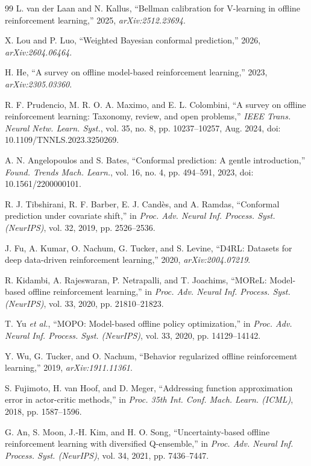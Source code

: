 \documentclass[journal]{IEEEtran}
\begin{document}
\begin{thebibliography}{99}
L. van der Laan and N. Kallus, ``Bellman calibration for V-learning in offline reinforcement learning,'' 2025, \emph{arXiv:2512.23694}.

X. Lou and P. Luo, ``Weighted Bayesian conformal prediction,'' 2026, \emph{arXiv:2604.06464}.

H. He, ``A survey on offline model-based reinforcement learning,'' 2023, \emph{arXiv:2305.03360}.

R. F. Prudencio, M. R. O. A. Maximo, and E. L. Colombini, ``A survey on offline reinforcement learning: Taxonomy, review, and open problems,'' \emph{IEEE Trans. Neural Netw. Learn. Syst.}, vol. 35, no. 8, pp. 10237--10257, Aug. 2024, doi: 10.1109/TNNLS.2023.3250269.

A. N. Angelopoulos and S. Bates, ``Conformal prediction: A gentle introduction,'' \emph{Found. Trends Mach. Learn.}, vol. 16, no. 4, pp. 494--591, 2023, doi: 10.1561/2200000101.

R. J. Tibshirani, R. F. Barber, E. J. Cand\`es, and A. Ramdas, ``Conformal prediction under covariate shift,'' in \emph{Proc. Adv. Neural Inf. Process. Syst. (NeurIPS)}, vol. 32, 2019, pp. 2526--2536.

J. Fu, A. Kumar, O. Nachum, G. Tucker, and S. Levine, ``D4RL: Datasets for deep data-driven reinforcement learning,'' 2020, \emph{arXiv:2004.07219}.

R. Kidambi, A. Rajeswaran, P. Netrapalli, and T. Joachims, ``MOReL: Model-based offline reinforcement learning,'' in \emph{Proc. Adv. Neural Inf. Process. Syst. (NeurIPS)}, vol. 33, 2020, pp. 21810--21823.

T. Yu \emph{et al.}, ``MOPO: Model-based offline policy optimization,'' in \emph{Proc. Adv. Neural Inf. Process. Syst. (NeurIPS)}, vol. 33, 2020, pp. 14129--14142.

Y. Wu, G. Tucker, and O. Nachum, ``Behavior regularized offline reinforcement learning,'' 2019, \emph{arXiv:1911.11361}.

S. Fujimoto, H. van Hoof, and D. Meger, ``Addressing function approximation error in actor-critic methods,'' in \emph{Proc. 35th Int. Conf. Mach. Learn. (ICML)}, 2018, pp. 1587--1596.

G. An, S. Moon, J.-H. Kim, and H. O. Song, ``Uncertainty-based offline reinforcement learning with diversified Q-ensemble,'' in \emph{Proc. Adv. Neural Inf. Process. Syst. (NeurIPS)}, vol. 34, 2021, pp. 7436--7447.


\end{thebibliography}
\end{document}
